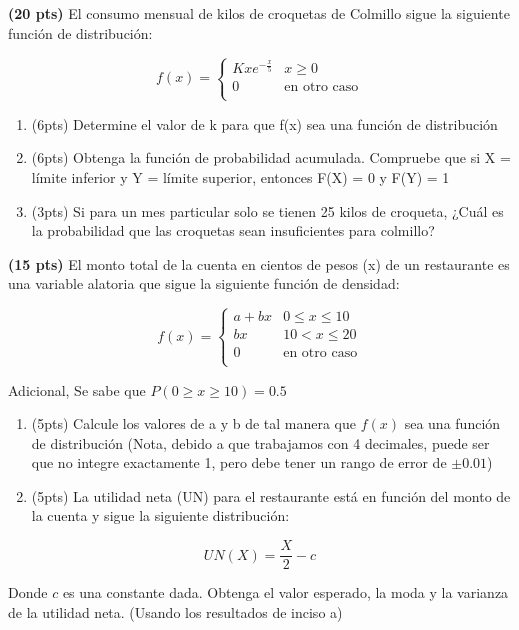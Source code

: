 \documentclass[addpoints]{exam}
\theoremstyle{mytheor}
\begin{document}
\begin{questions}
\question \textbf{(20 pts)}
El consumo mensual de kilos de croquetas de Colmillo sigue la siguiente función de distribución:

\[   
f(x) = 
     \begin{cases}
       Kxe^{-\frac{x}{5}} & x \geq 0\\
       0 & \text{en otro caso} \\
     \end{cases}
\]
$$$$

\begin{enumerate}[label=\Alph*)]
\item (6pts) Determine el valor de k para que f(x) sea una función de distribución
\item (6pts) Obtenga la función de probabilidad acumulada. Compruebe que si X = límite inferior y Y = límite superior, entonces F(X) = 0 y F(Y) = 1
\item (3pts) Si para un mes particular solo se tienen 25 kilos de croqueta, ¿Cuál es la probabilidad que las croquetas sean insuficientes para colmillo?
\end{enumerate}

\question \textbf{(15 pts)}
El monto total de la cuenta en cientos de pesos (x) de un restaurante es una variable alatoria que sigue la siguiente función de densidad:


\[   
f(x) = 
     \begin{cases}
       a+bx & 0 \leq x \leq 10\\
       bx & 10 < x \leq 20\\
       0 & \text{en otro caso} \\
     \end{cases}
\]

Adicional, Se sabe que $P(0 \geq x \geq 10) = 0.5$

\begin{enumerate}[label=\Alph*)]
\item (5pts) Calcule los valores de a y b de tal manera que $f(x)$ sea una función de distribución (Nota, debido a que trabajamos con 4 decimales, puede ser que no integre exactamente 1, pero debe tener un rango de error de $\pm 0.01$)
\item (5pts) La utilidad neta (UN) para el restaurante está en función del monto de la cuenta y sigue la siguiente distribución: 
\end{enumerate}
$$ UN(X) = \frac{X}{2}-c $$
 
Donde $c$ es una constante dada. Obtenga el valor esperado, la moda y la varianza de la utilidad neta. (Usando los resultados de inciso a)


\end{questions}
\end{document}
